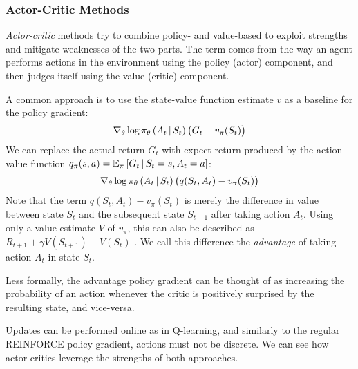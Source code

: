 \subsubsection{Actor-Critic Methods}
\textit{Actor-critic} methods \cite{bible} try to combine policy- and value-based to exploit strengths and mitigate weaknesses of the two parts. The term comes from the way an agent performs actions in the environment using the policy (actor) component, and then judges itself using the value (critic) component.

A common approach is to use the state-value function estimate $v$ as a baseline for the policy gradient:
\begin{equation*}
    \nabla_\theta \log \pi_\theta\left(A_t \,\middle|\, S_t\right) \left(G_t - v_\pi(S_t)\right)
\end{equation*}
We can replace the actual return $G_t$ with expect return produced by the action-value function $q_\pi(s, a) = \mathbb{E}_\pi \left[G_t \,\middle|\, S_t = s, A_t = a\right]$:
\begin{equation*}
    \nabla_\theta \log \pi_\theta\left(A_t \,\middle|\, S_t\right) \left(q(S_t, A_t) - v_\pi(S_t)\right)
\end{equation*}
Note that the term $q(S_t, A_t) - v_\pi(S_t)$ is merely the difference in value between state $S_t$ and the subsequent state $S_{t+1}$ after taking action $A_t$. Using only a value estimate $V$ of $v_\pi$, this can also be described as $R_{t+1} + \gamma V(S_{t+1}) - V(S_t)$ \cite{a3c}. We call this difference the \textit{advantage} of taking action $A_t$ in state $S_t$.

Less formally, the advantage policy gradient can be thought of as increasing the probability of an action whenever the critic is positively surprised by the resulting state, and vice-versa.

Updates can be performed online as in Q-learning, and similarly to the regular REINFORCE policy gradient, actions must not be discrete. We can see how actor-critics leverage the strengths of both approaches.